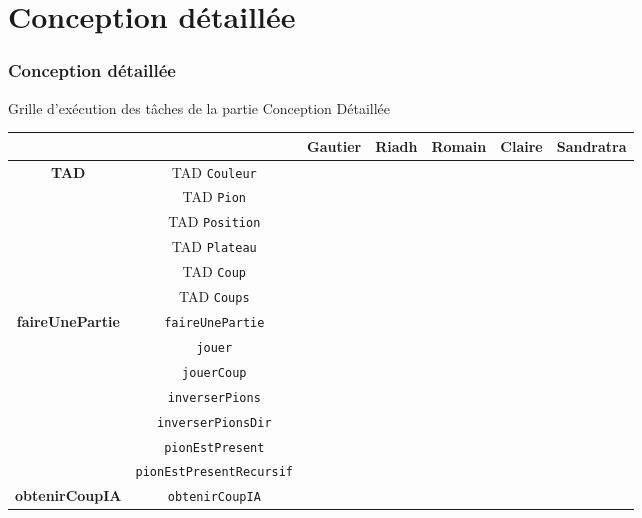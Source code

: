 \documentclass{beamer}
\renewcommand{\tt}[1]{\texttt{#1}}
\begin{document}
		\section{Conception détaillée}
	\begin{frame}[label=cd] %
	\frametitle{Conception détaillée}
	\begin{alertblock}{Grille d’exécution des tâches de la partie \og Conception Détaillée \fg}
   	\rightskip=0pt\leftskip=0pt
	{\tiny
   	\begin{table}[h]
\begin{center}
\begin{tabular}{|c|c|c|c|c|c|c|}
  \cline{3-7}
   \multicolumn{2}{c|}{ }  & \textbf{Gautier} & \textbf{Riadh} & \textbf{Romain} & \textbf{Claire} & \textbf{Sandratra}\\ \hline
     \multirow{6}{*}{\textbf{TAD}} &  TAD \tt{Couleur} & & & &\cellcolor{lightgray} & \\ \cline{2-7}
     			 &  TAD \tt{Pion} & & & &\cellcolor{lightgray} & \\ \cline{2-7}
       		 &  TAD \tt{Position} & & & &\cellcolor{lightgray} & \\ \cline{2-7}
       		 &  TAD \tt{Plateau} & \cellcolor{lightgray} & & & & \\ \cline{2-7}
       		 &  TAD \tt{Coup} & \cellcolor{lightgray} & & & & \\ \cline{2-7}
       		 &  TAD \tt{Coups} & \cellcolor{lightgray} & & & & \\ \hline
      \multirow{7}{*}{\textbf{faireUnePartie}}  &\tt{faireUnePartie} & & \cellcolor{lightgray}  & & & \\ \cline{2-7}
      			&\tt{jouer} & & & & & \cellcolor{lightgray} \\ \cline{2-7}
      			&\tt{jouerCoup} & & & &  \cellcolor{lightgray}   & \\ \cline{2-7}
      			&\tt{inverserPions} & & \cellcolor{lightgray}  & &\cellcolor{lightgray} & \cellcolor{lightgray} \\ \cline{2-7}
      			&\tt{inverserPionsDir} & & \cellcolor{lightgray}  & &\cellcolor{lightgray} & \cellcolor{lightgray} \\ \cline{2-7}
      			&\tt{pionEstPresent} & & & &  \cellcolor{lightgray}   & \\ \cline{2-7}
      			&\tt{pionEstPresentRecursif} & & & &  \cellcolor{lightgray}   & \\ \hline
      	\multirow{8}{*}{\textbf{obtenirCoupIA}} & \tt{obtenirCoupIA} & \cellcolor{lightgray} & &\cellcolor{lightgray} & & \\\cline{2-7}

\end{tabular}
\end{center}
\end{table}}
\end{alertblock}
\end{frame}
\end{document}
